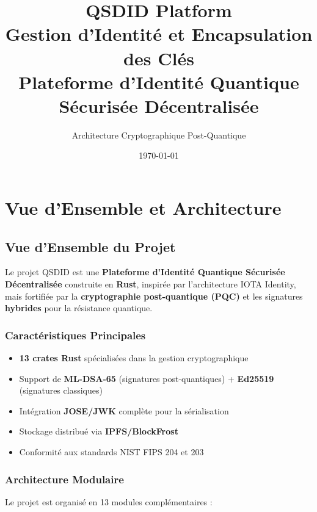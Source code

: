 \documentclass[12pt,a4paper]{report}
\title{\textbf{QSDID Platform}\\
  \Large Gestion d'Identité et Encapsulation des Clés\\
  \normalsize Plateforme d'Identité Quantique Sécurisée Décentralisée}
\author{Architecture Cryptographique Post-Quantique}
\date{\today}
\begin{document}
\maketitle

\tableofcontents
\newpage

\chapter{Vue d'Ensemble et Architecture}

\section{Vue d'Ensemble du Projet}

Le projet QSDID est une \textbf{Plateforme d'Identité Quantique Sécurisée Décentralisée} construite en \textbf{Rust}, inspirée par l'architecture IOTA Identity, mais fortifiée par la \textbf{cryptographie post-quantique (PQC)} et les signatures \textbf{hybrides} pour la résistance quantique.

\subsection{Caractéristiques Principales}

\begin{itemize}
  \item \textbf{13 crates Rust} spécialisées dans la gestion cryptographique
  \item Support de \textbf{ML-DSA-65} (signatures post-quantiques) + \textbf{Ed25519} (signatures classiques)
  \item Intégration \textbf{JOSE/JWK} complète pour la sérialisation
  \item Stockage distribué via \textbf{IPFS/BlockFrost}
  \item Conformité aux standards NIST FIPS 204 et 203
\end{itemize}

\subsection{Architecture Modulaire}

Le projet est organisé en 13 modules complémentaires :
\end{document}

